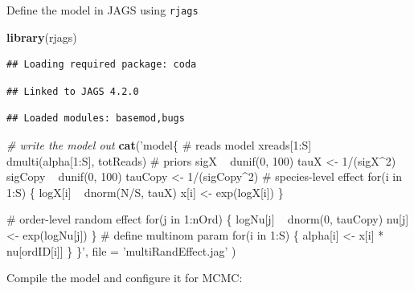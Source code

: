 \documentclass[]{article}
\newenvironment{Shaded}{\begin{snugshade}}{\end{snugshade}}
\newcommand{\KeywordTok}[1]{\textcolor[rgb]{0.13,0.29,0.53}{\textbf{{#1}}}}
\newcommand{\DataTypeTok}[1]{\textcolor[rgb]{0.13,0.29,0.53}{{#1}}}
\newcommand{\StringTok}[1]{\textcolor[rgb]{0.31,0.60,0.02}{{#1}}}
\newcommand{\CommentTok}[1]{\textcolor[rgb]{0.56,0.35,0.01}{\textit{{#1}}}}
\newcommand{\NormalTok}[1]{{#1}}
\begin{document}
Define the model in JAGS using \texttt{rjags}

\begin{Shaded}
\begin{Highlighting}[]
\KeywordTok{library}\NormalTok{(rjags)}
\end{Highlighting}
\end{Shaded}

\begin{verbatim}
## Loading required package: coda
\end{verbatim}

\begin{verbatim}
## Linked to JAGS 4.2.0
\end{verbatim}

\begin{verbatim}
## Loaded modules: basemod,bugs
\end{verbatim}

\begin{Shaded}
\begin{Highlighting}[]
\CommentTok{# write the model out}
\KeywordTok{cat}\NormalTok{(}\StringTok{'model\{}
\StringTok{        # reads model}
\StringTok{        xreads[1:S] ~ dmulti(alpha[1:S], totReads)}
\StringTok{    }
\StringTok{        # priors}
\StringTok{        sigX ~ dunif(0, 100)}
\StringTok{        tauX <- 1/(sigX^2)}
\StringTok{        sigCopy ~ dunif(0, 100)}
\StringTok{        tauCopy <- 1/(sigCopy^2)}
\StringTok{    }
\StringTok{        # species-level effect}
\StringTok{        for(i in 1:S) \{}
\StringTok{            logX[i] ~ dnorm(N/S, tauX)}
\StringTok{            x[i] <- exp(logX[i])}
\StringTok{        \}}

\StringTok{        # order-level random effect}
\StringTok{        for(j in 1:nOrd) \{}
\StringTok{            logNu[j] ~ dnorm(0, tauCopy)}
\StringTok{            nu[j] <- exp(logNu[j])}
\StringTok{        \}}
\StringTok{    }
\StringTok{        # define multinom param}
\StringTok{        for(i in 1:S) \{}
\StringTok{            alpha[i] <- x[i] * nu[ordID[i]]}
\StringTok{        \}}
\StringTok{    \}'}\NormalTok{,}
    \DataTypeTok{file =} \StringTok{'multiRandEffect.jag'} \NormalTok{)}
\end{Highlighting}
\end{Shaded}

Compile the model and configure it for MCMC:
\end{document}
